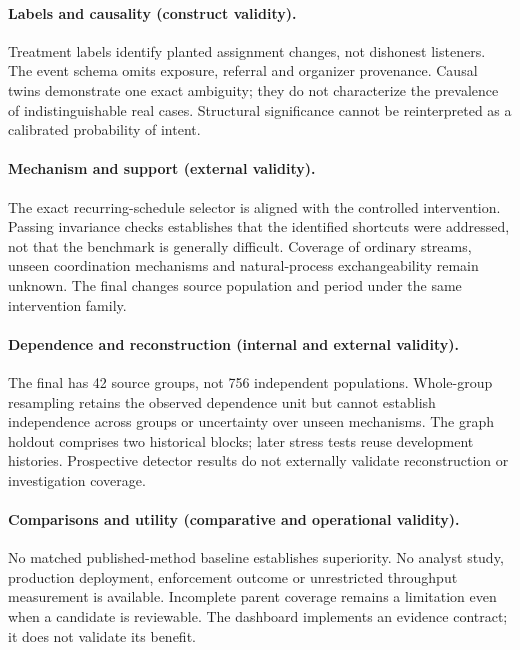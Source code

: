 \documentclass[11pt,letterpaper]{article}
\begin{document}
\paragraph{Labels and causality (construct validity).} Treatment labels identify planted assignment changes, not dishonest listeners. The event schema omits exposure, referral and organizer provenance. Causal twins demonstrate one exact ambiguity; they do not characterize the prevalence of indistinguishable real cases. Structural significance cannot be reinterpreted as a calibrated probability of intent.

\paragraph{Mechanism and support (external validity).} The exact recurring-schedule selector is aligned with the controlled intervention. Passing invariance checks establishes that the identified shortcuts were addressed, not that the benchmark is generally difficult. Coverage of ordinary streams, unseen coordination mechanisms and natural-process exchangeability remain unknown. The final changes source population and period under the same intervention family.

\paragraph{Dependence and reconstruction (internal and external validity).} The final has 42 source groups, not 756 independent populations. Whole-group resampling retains the observed dependence unit but cannot establish independence across groups or uncertainty over unseen mechanisms. The graph holdout comprises two historical blocks; later stress tests reuse development histories. Prospective detector results do not externally validate reconstruction or investigation coverage.

\paragraph{Comparisons and utility (comparative and operational validity).} No matched published-method baseline establishes superiority. No analyst study, production deployment, enforcement outcome or unrestricted throughput measurement is available. Incomplete parent coverage remains a limitation even when a candidate is reviewable. The dashboard implements an evidence contract; it does not validate its benefit.
\end{document}
